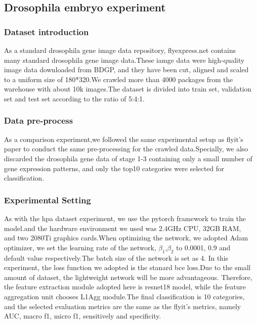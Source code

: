 \documentclass[10pt,twocolumn,letterpaper]{article}
\begin{document}
\subsection{Drosophila embryo experiment}

\subsubsection{Dataset introduction}
As a standard drosophila gene image data repository\cite{ref26}, flyexpress.net contains many standard drosophila gene image data.These iamge data were high-quality image data downloaded from BDGP, and they have been cut, aligned and scaled to a uniform size of 180*320.We crawled more than 4000 packages from the warehouse with about 10k images.The dataset is divided into train set, validation set and test set according to the ratio of 5:4:1.

\subsubsection{Data pre-process}
As a comparison experiment,we followed the same experimental setup as flyit's\cite{ref27} paper to conduct the same pre-processing for the crawled data.Specially, we also discarded the drosophila gene data of stage 1-3 containing only a small number of gene expression patterns, and only the top10 categories were selected for classification.

\subsubsection{Experimental Setting}
As with the hpa dataset experiment, we use the pytorch framework to train the model.and the hardware environment we used was 2.4GHz CPU, 32GB RAM, and two 2080Ti graphics cards.When optimizing the network, we adopted Adam optimizer\cite{ref25}, we set the learning rate of the network, $\beta_1$,$\beta_2$ to 0.0001, 0.9 and default value respectively.The batch size of the network is set as 4. In this experiment, the loss function we adopted is the stanard bce loss.Due to the small amount of dataset, the lightweight network will be more advantageous. Therefore, the feature extraction module adopted here is resnet18 model, while the feature aggregation unit chooses L1Agg module.The final classification is 10 categories, and the selected evaluation metrics are the same as the flyit's\cite{ref27} metrics, namely AUC, macro f1, micro f1, sensitively and specificity.
\end{document}
